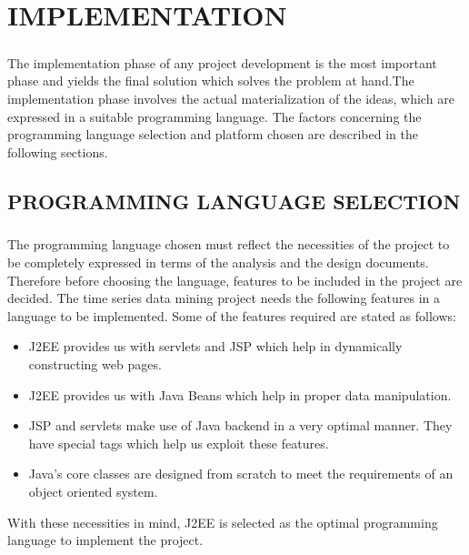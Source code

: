 \documentclass[12pt]{report}
\begin{document}
\chapter{IMPLEMENTATION}
\pagestyle{fancy}
\chead{}
\rfoot{\small{\thepage}}
\renewcommand{\headrulewidth}{0.4pt}
\renewcommand{\footrulewidth}{0.4pt}
\paragraph{}The implementation phase of any project development is the most important phase and yields the final solution which solves the problem at hand.The implementation phase involves the actual materialization of the ideas, which are expressed in a suitable programming language. The factors concerning the programming language selection and platform chosen are described in the following sections.
\section{PROGRAMMING LANGUAGE SELECTION}

\paragraph{}The programming language chosen must reflect the necessities of the project to be completely expressed in terms of the analysis and the design documents. Therefore before choosing the language, features to be included in the project are decided. The time series data mining project needs the following features in a language to be implemented. Some of the features required are stated as follows:
\begin{itemize}
\item J2EE provides us with servlets and JSP which help in dynamically constructing web pages.
\item J2EE provides us with Java Beans which help in proper data manipulation.
\item JSP and servlets make use of Java backend in a very optimal manner. They have special tags which help us exploit these features.
\item Java's core classes are designed from scratch to meet the requirements of an object oriented system.
\end{itemize} 
With these necessities in mind, J2EE is selected as the optimal programming language to implement the project.
\end{document}
